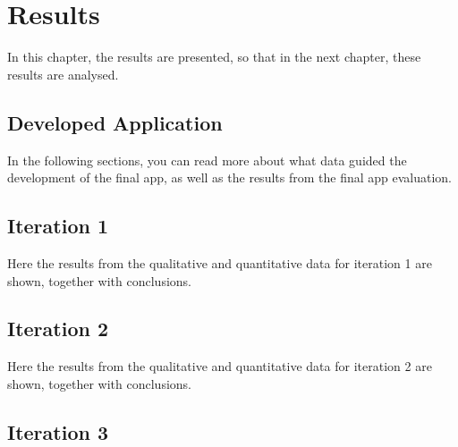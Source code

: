 \chapter{Results}\label{cha:Research}
%


In this chapter, the results are presented, so that in the next chapter, these results are analysed. 

%

\section{Developed Application}

  

In the following sections, you can read more about what data guided the development of the final app, as well as the results from the final app evaluation.

\section{Iteration 1}

Here the results from the qualitative and quantitative data for iteration 1 are shown, together with conclusions.





\section{Iteration 2}

Here the results from the qualitative and quantitative data for iteration 2 are shown, together with conclusions.





\section{Iteration 3}

